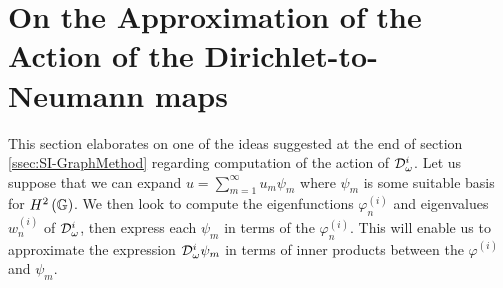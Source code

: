 \section{On the Approximation of the Action of the Dirichlet-to-Neumann maps} \label{sec:SIApp-NonLocalSolve}
This section elaborates on one of the ideas suggested at the end of section \ref{ssec:SI-GraphMethod} regarding computation of the action of $\mathcal{D}_\omega^i$.
Let us suppose that we can expand $u=\sum_{m=1}^{\infty}u_m\psi_m$ where $\psi_m$ is some suitable basis for $H^2\left( \mathbb{G} \right)$.
We then look to compute the eigenfunctions $\varphi^{(i)}_n$ and eigenvalues $w^{(i)}_n$ of $\mathcal{D}_{\omega}^i$, then express each $\psi_m$ in terms of the $\varphi^{(i)}_n$.
This will enable us to approximate the expression $\mathcal{D}^i_\omega\psi_m$ in terms of inner products between the $\varphi^{(i)}$ and $\psi_m$.

